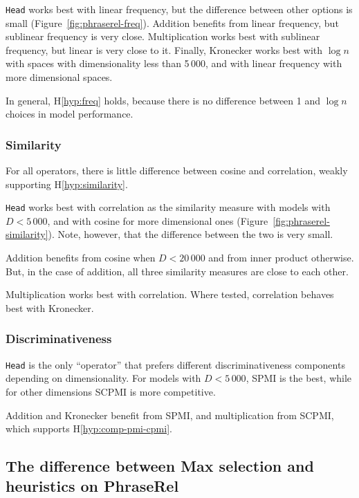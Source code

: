 \texttt{Head} works best with linear frequency, but the difference between other options is small (Figure~\ref{fig:phraserel-freq}). Addition benefits from linear frequency, but sublinear frequency is very close. Multiplication works best with sublinear frequency, but linear is very close to it. Finally, Kronecker works best with $\log n$ with spaces with dimensionality less than 5\,000, and with linear frequency with more dimensional spaces.

In general, H\ref{hyp:freq} holds, because there is no difference between 1 and $\log n$ choices in model performance.



\subsubsection{Similarity}
\label{sec:similarity-phraserel}

For all operators, there is little difference between cosine and correlation, weakly supporting H\ref{hyp:similarity}.

\texttt{Head} works best with correlation as the similarity measure with models with $D < 5\,000$, and with cosine for more dimensional ones (Figure~\ref{fig:phraserel-similarity}). Note, however, that the difference between the two is very small.

Addition benefits from cosine when $D < 20\,000$ and from inner product otherwise. But, in the case of addition, all three similarity measures are close to each other.

Multiplication works best with correlation. Where tested, correlation behaves best with Kronecker.

\subsubsection{Discriminativeness}
\label{sec:discriminativeness-phraserel}



\texttt{Head} is the only ``operator'' that prefers  different discriminativeness components depending on dimensionality. For models with $D < 5\,000$, SPMI is the best, while for other dimensions SCPMI is more competitive.

Addition and Kronecker benefit from SPMI, and multiplication from SCPMI, which supports H\ref{hyp:comp-pmi-cpmi}.

\subsection{The difference between Max selection and heuristics on PhraseRel}
\label{sec:diff-phraserel}

